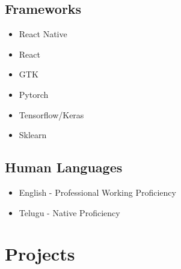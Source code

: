 \documentclass{article}
\begin{document}
\subsection{Frameworks}
\begin{multicols}{4}
    \begin{itemize}
        \item React Native
        \item React
        \item GTK
        \item Pytorch
        \item Tensorflow/Keras
        \item Sklearn
    \end{itemize}
\end{multicols}


\subsection{Human Languages}
\begin{itemize}
    \item English - Professional Working Proficiency
    \item Telugu - Native Proficiency
\end{itemize}

\section{Projects}
\end{document}
